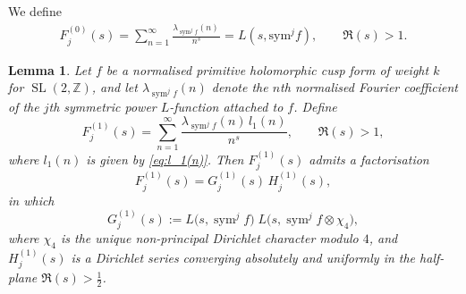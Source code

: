 \documentclass[10pt]{amsart}
\newtheorem{lemma}[theorem]{Lemma}
\begin{document}
We define
\begin{align} \label{lem:F0}
F_{j}^{(0)}(s)=\sum_{n=1}^{\infty}\frac{\lambda_{\operatorname{sym}^{j}f}(n)\,}{n^{s}} = L(s, \mathrm{sym}^jf), \qquad \Re(s)>1.    
\end{align}

\begin{lemma} \label{lem:F1}
Let \(f\) be a normalised primitive holomorphic cusp form of weight \(k\) for \(\operatorname{SL}(2,\mathbb{Z})\), 
and let \(\lambda_{\operatorname{sym}^{j}f}(n)\) denote the \(n\)th normalised Fourier coefficient 
of the \(j\)th symmetric power \(L\)-function attached to \(f\). Define
\[
F_{j}^{(1)}(s)=\sum_{n=1}^{\infty}\frac{\lambda_{\operatorname{sym}^{j}f}(n)\,l_1(n)}{n^{s}}, \qquad \Re(s)>1,
\]
where \(l_1(n)\) is given by \eqref{eq:l_1(n)}. Then \(F_{j}^{(1)}(s)\) admits a factorisation
\[
F_{j}^{(1)}(s)=G_{j}^{(1)}(s)\,H_{j}^{(1)}(s),
\]
in which
\[
G_{j}^{(1)}(s):=L\!\bigl(s,\operatorname{sym}^{j}f\bigr)\; 
        L\!\bigl(s,\operatorname{sym}^{j}f\otimes\chi_4\bigr),
\]
where \(\chi_4\) is the unique non-principal Dirichlet character modulo \(4\), 
and \(H_{j}^{(1)}(s)\) is a Dirichlet series converging absolutely and uniformly 
in the half-plane \(\Re(s)>\frac{1}{2}\).
\end{lemma}
\end{document}
